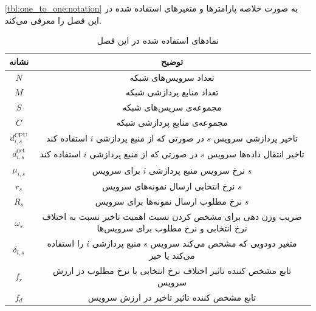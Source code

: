     \cref{tbl:one_to_one:notation} به صورت خلاصه پارامتر‌ها و متغیر‌های استفاده شده در این فصل را معرفی می‌کند.
    \begin{table}[h]
      \caption{نماد‌های استفاده شده در این فصل}
      \begin{tabularx}{\textwidth}{|c|C|} \hline
        نشانه                & توضیح                                                                                     \\ \hline
        $N$                  & تعداد سرویس‌های شبکه                                                                       \\ \hline
        $M$                  & تعداد منابع پردازشی شبکه                                                                  \\ \hline
        $S$                  & مجموعه‌ی سریس‌های شبکه                                                                      \\ \hline
        $C$                  & مجموعه‌ی منابع پردازشی شبکه                                                                \\ \hline
        $d_{i,s}^\text{CPU}$ & تاخیر پردازشی سرویس $s$ در صورتی که از منبع پردازشی $i$ استفاده کند                       \\ \hline
        $d_{i,s}^\text{net}$ & تاخیر انتقال داده‌ها سرویس $s$  در صورتی که از منبع پردازشی $i$ استفاده کند                \\ \hline
        $\mu_{i,s}$         & نرخ سرویس منبع پردازشی $i$ برای سرویس $s$                                                  \\ \hline
        $r_s$               & نرخ انتخابی ارسال نمونه‌های سرویس $s$                                                       \\ \hline
        $R_s$               & نرخ مطلوب ارسال نمونه‌ها برای سرویس $s$                                                     \\ \hline
        $\omega_s$          & ضریب وزن دهی برای مشخص کردن نسبت اهمیت تاخیر نسبت به اختلاف نرخ انتخابی و نرخ مطلوب برای سرویس‌ها \\ \hline
        $\delta_{i,s}$      & متغیر دودویی که مشخص می‌کند سرویس $s$ منبع پردازشی $i$ را استفاده می‌کند یا خیر              \\ \hline
        $f_r$               & تابع مشخص کننده تاثیر اختلاف نرخ انتخابی با نرخ مطلوب در ارزش سرویس                         \\ \hline
        $f_d$               & تابع مشخص کننده تاثیر تاخیر در ارزش سرویس                                                  \\ \hline

\end{tabularx}
\end{table}
